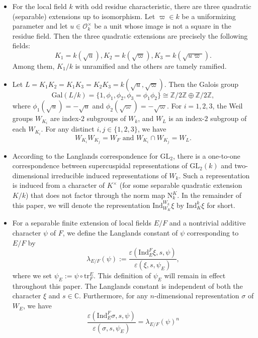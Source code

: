 \documentclass[12pt]{amsart}
\newcommand{\Gal}{{\mathrm{Gal}}}
\newcommand{\GL}{{\mathrm{GL}}}
\newcommand{\tr}{{\mathrm{tr}}}
\theoremstyle{Theorem}
\theoremstyle{Theorem}
\theoremstyle{Theorem}
\theoremstyle{Theorem}
\theoremstyle{Plain}
\theoremstyle{remark}
\theoremstyle{remark}
\theoremstyle{Definition}
\begin{document}
\begin{itemize}
    \item For the local field $k$ with odd residue characteristic, there are three quadratic (separable) extensions up to isomorphism. Let $ \varpi \in k$ be a uniformizing parameter and let $ u \in \mathcal{O}_k^\times $ be a unit whose image is not a square in the residue field. Then the three quadratic extensions are precisely the following fields:
    \[
        K_1 = k( \sqrt u ), K_2=k( \sqrt\varpi ), K_3 = k( \sqrt{ u\varpi } ).
    \]
    Among them, $K_1/k$ is unramified and the others are tamely ramified.
    \item Let $ L = K_1 K_2 = K_1 K_3 = K_2 K_3 = k( \sqrt{u}, \sqrt{ \varpi } ) $. Then the Galois group
    \[
        \Gal ( L/k ) =\{ 1, \phi_1, \phi_2, \phi_3 = \phi_1 \phi_2 \} \cong \mathbb{Z} / 2\mathbb{Z} \oplus \mathbb{Z} / 2\mathbb{Z},
    \]
    where $ \phi_1 \left( \sqrt{u} \right) = - \sqrt{u} $ and $ \phi_2 \left( \sqrt{ \varpi } \right) = -\sqrt{ \varpi } $. For $ i = 1, 2, 3 $, the Weil groups $ W_{ K_i } $ are index-$2$ subgroups of $W_k$, and $W_L$ is an index-$2$ subgroup of each $ W_{ K_i } $. For any distinct $ i, j \in \{ 1, 2, 3 \} $, we have
    \[
        W_{ K_i } W_{ K_j } = W_F \text{ and } W_{ K_i } \cap W_{ K_j } = W_L.
    \]
    \item According to the Langlands correspondence for $\GL_2$, there is a one-to-one correspondence between supercuspidal representations of $\GL_2(k)$ and two-dimensional irreducible induced representations of $W_k$. Such a representation is induced from a character of $K^\times$ (for some separable quadratic extension $K/k$) that does not factor through the norm map $ \mathrm{N}^K_k $. In the remainder of this paper, we will denote the representation $ \mathrm{Ind}^{ W_k }_{ W_K } \xi $ by $ \mathrm{Ind}^k_K \xi $ for short.
    \item For a separable finite extension of local fields $E/F$ and a nontrivial additive character $\psi$ of $F$, we define the Langlands constant of $\psi$ corresponding to $E/F$ by
    \[
        \lambda_{ E/F } ( \psi ) := \frac{ \varepsilon( \mathrm{Ind}^F_E \xi, s, \psi ) }{ \varepsilon( \xi, s, \psi_E ) },
    \]
    where we set $ \psi_E := \psi \circ \tr^E_F$. This definition of $\psi_E$ will remain in effect throughout this paper. The Langlands constant is independent of both the character $\xi$ and $ s \in \mathbb{C} $. Furthermore, for any $n$-dimensional representation $\sigma$ of $W_E$, we have
    \[
        \frac{ \varepsilon \left( \mathrm{Ind}^F_E \sigma, s, \psi \right) }{ \varepsilon( \sigma, s, \psi_E ) } = \lambda_{E/F} ( \psi )^n
\]
\end{itemize}
\end{document}
